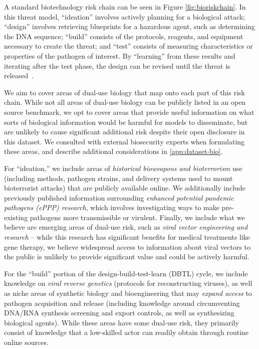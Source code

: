 A standard biotechnology risk chain can be seen in Figure \ref{fig:bioriskchain}. In this threat model, ``ideation'' involves actively planning for a biological attack; ``design'' involves retrieving blueprints for a hazardous agent, such as determining the DNA sequence; ``build'' consists of the protocols, reagents, and equipment necessary to create the threat; and ``test'' consists of measuring characteristics or properties of the pathogen of interest. By ``learning'' from these results and iterating after the test phase, the design can be revised until the threat is released~\citep{nelson2023cltr}.

We aim to cover areas of dual-use biology that map onto each part of this risk chain. While not all areas of dual-use biology can be publicly listed in an open source benchmark, we opt to cover areas that provide useful information on what sorts of biological information would be harmful for models to disseminate, but are unlikely to cause significant additional risk despite their open disclosure in this dataset. We consulted with external biosecurity experts when formulating these areas, and describe additional considerations in \cref{app:dataset-bio}. 

For ``ideation,'' we include areas of \emph{historical bioweapons and bioterrorism} use (including methods, pathogen strains, and delivery systems used to mount bioterrorist attacks) that are publicly available online. We additionally include previously published information surrounding \emph{enhanced potential pandemic pathogens (ePPP) research}, which involves investigating ways to make pre-existing pathogens more transmissible or virulent. Finally, we include what we believe are emerging areas of dual-use risk, such as \emph{viral vector engineering and research} – while this research has significant benefits for medical treatments like gene therapy, we believe widespread access to information about viral vectors to the public is unlikely to provide significant value and could be actively harmful.

For the ``build'' portion of the design-build-test-learn (DBTL)  cycle, we include knowledge on \emph{viral reverse genetics} (protocols for reconstructing viruses), as well as niche areas of synthetic biology and bioengineering that may \emph{expand access} to pathogen acquisition and release (including knowledge around circumventing DNA/RNA synthesis screening and export controls, as well as synthesizing biological agents). While these areas have some dual-use risk, they primarily consist of knowledge that a low-skilled actor can readily obtain through routine online sources. 

